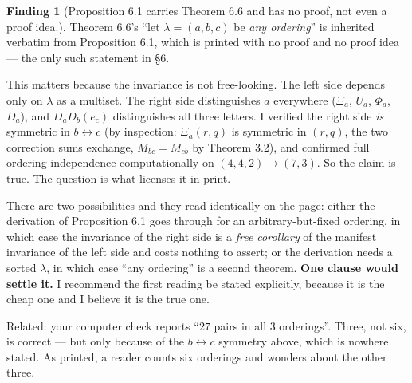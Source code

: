 \documentclass[11pt]{article}
\theoremstyle{definition}
\newtheorem{finding}{Finding}
\begin{document}
\begin{finding}[Proposition 6.1 carries Theorem 6.6 and has no proof, not even a proof idea.]
Theorem 6.6's ``let $\lambda=(a,b,c)$ be \emph{any ordering}'' is inherited verbatim from
Proposition 6.1, which is printed with no proof and no proof idea --- the only such statement
in \S6.

This matters because the invariance is not free-looking. The left side depends only on
$\lambda$ as a multiset. The right side distinguishes $a$ everywhere ($\Xi_a$, $U_a$,
$\Phi_a$, $D_a$), and $D_aD_b(e_c)$ distinguishes all three letters. I verified the
right side \emph{is} symmetric in $b\leftrightarrow c$ (by inspection: $\Xi_a(r,q)$ is
symmetric in $(r,q)$, the two correction sums exchange, $M_{bc}=M_{cb}$ by Theorem 3.2), and
confirmed full ordering-independence computationally on $(4,4,2)\to(7,3)$. So the claim is
true. The question is what licenses it in print.

There are two possibilities and they read identically on the page: either the derivation of
Proposition 6.1 goes through for an arbitrary-but-fixed ordering, in which case the invariance
of the right side is a \emph{free corollary} of the manifest invariance of the left side and
costs nothing to assert; or the derivation needs a sorted $\lambda$, in which case ``any
ordering'' is a second theorem. \textbf{One clause would settle it.} I recommend the first
reading be stated explicitly, because it is the cheap one and I believe it is the true one.

Related: your computer check reports ``$27$ pairs in all $3$ orderings''. Three, not six, is
correct --- but only because of the $b\leftrightarrow c$ symmetry above, which is nowhere
stated. As printed, a reader counts six orderings and wonders about the other three.
\end{finding}
\end{document}
